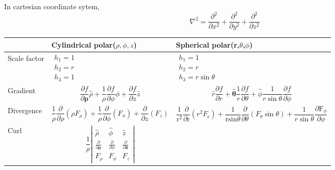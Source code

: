 In cartesian coordinate sytem,
$$ \nabla^{2}=\frac{\partial^{2}}{\partial x^{2}}+\frac{\partial^{2}}{\partial y^{2}}+\frac{\partial^{2}}{\partial z^{2}}$$
\begin{table}[h]
	\overfullrule=0pt
	\begin{tabular}{|p{1.8cm}|p{6cm}|p{8.5cm}|}
		\hline
		
		&\textbf{Cylindrical polar}($ \rho,\phi,z$) & \textbf{Spherical polar}(r,$\theta$,$\phi$)  \\\hline
		Scale factor&  ${\begin{array}{l}
				h_{1}=1  \\
				h_{2}=r \\
				h_{3}=1
		\end{array}}$ &${\begin{array}{l}
				h_{1}=1  \\
				h_{2}=r \\
				h_{3}=r \sin \theta
		\end{array}}$   \\\hline
		Gradient& $$
		\frac{\partial {f}}{\partial \boldsymbol{\rho}} \hat{\rho}+\frac{1}{\rho}\frac{\partial {f}}{\partial {\phi}} \hat{\phi}+\frac{\partial {f}}{\partial {z}} \hat{{z}}
		$$\vspace{1cm}&$$
		\hat{{r}} \frac{\partial f}{\partial r}+\hat{\boldsymbol{\theta}} \frac{1}{r} \frac{\partial f}{\partial \theta}+\hat{{\phi}} \frac{1}{r \sin \theta} \frac{\partial f}{\partial \phi}
		$$\\\hline
		Divergence\vspace{1cm}& $$
		\frac{1}{\rho} \frac{\partial }{\partial \rho}\left(\rho F_{\rho}\right)+\frac{1}{\rho} \frac{\partial }{\partial \phi}\left(F_{\phi}\right)+\frac{\partial }{\partial z}\left(F_{z}\right)
		$$ & $$
		\frac{1}{\mathrm{r}^{2}} \frac{\partial}{\partial \mathrm{r}}\left(r^{2} F_{\mathrm{r}}\right)+\frac{1}{\mathrm{rsin} \theta} \frac{\partial}{\partial \theta}\left(F_{\theta} \sin \theta\right)+\frac{1}{r \sin \theta} \frac{\partial \mathrm{F}_{\phi}}{\partial \phi}
		$$ \\\hline
		Curl\vspace{1cm}&$$
		\frac{1}{\rho } \left|\begin{array}{ccc}
			\hat{\rho} & \hat{\phi} & \hat{{z}} \\
			\frac{\partial}{\partial \boldsymbol{\rho}} & \frac{\partial}{\partial \phi} & \frac{\partial}{\partial \mathbf{z}} \\
			{F}_{\rho} & {F}_{\phi} & {F}_{{z}}
		\end{array}\right|
$$
\end{tabular}
\end{table}
